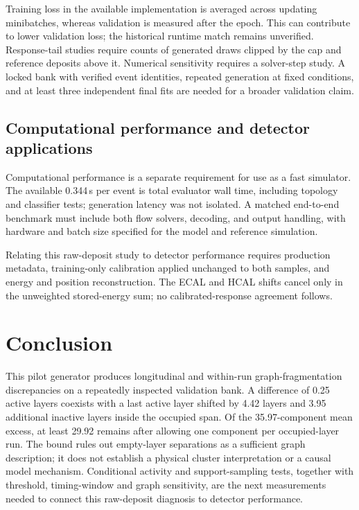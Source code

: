 \documentclass[11pt]{article}
\begin{document}
Training loss in the available implementation is averaged across updating minibatches, whereas validation is measured after the epoch. This can contribute to lower validation loss; the historical runtime match remains unverified. Response-tail studies require counts of generated draws clipped by the cap and reference deposits above it. Numerical sensitivity requires a solver-step study. A locked bank with verified event identities, repeated generation at fixed conditions, and at least three independent final fits are needed for a broader validation claim.

\subsection{Computational performance and detector applications}

Computational performance is a separate requirement for use as a fast simulator. The available 0.344\,s per event is total evaluator wall time, including topology and classifier tests; generation latency was not isolated. A matched end-to-end benchmark must include both flow solvers, decoding, and output handling, with hardware and batch size specified for the model and reference simulation.

Relating this raw-deposit study to detector performance requires production metadata, training-only calibration applied unchanged to both samples, and energy and position reconstruction. The ECAL and HCAL shifts cancel only in the unweighted stored-energy sum; no calibrated-response agreement follows.

\section{Conclusion}

This pilot generator produces longitudinal and within-run graph-fragmentation discrepancies on a repeatedly inspected validation bank. A difference of 0.25 active layers coexists with a last active layer shifted by 4.42 layers and 3.95 additional inactive layers inside the occupied span. Of the 35.97-component mean excess, at least 29.92 remains after allowing one component per occupied-layer run. The bound rules out empty-layer separations as a sufficient graph description; it does not establish a physical cluster interpretation or a causal model mechanism. Conditional activity and support-sampling tests, together with threshold, timing-window and graph sensitivity, are the next measurements needed to connect this raw-deposit diagnosis to detector performance.
\end{document}
